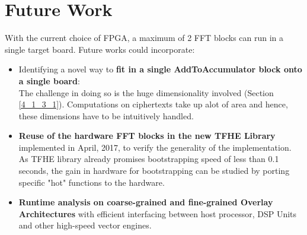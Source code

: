 \section{Future Work}
With the current choice of FPGA, a maximum of 2 FFT blocks can run in a single target board. Future works could incorporate:
\begin{itemize}
\item Identifying a novel way to \textbf{fit in a single AddToAccumulator block onto a single board}: \\The challenge in doing so is the huge dimensionality involved (Section \ref{4_1_3_1}). Computations on ciphertexts take up alot of area and hence, these dimensions have to be intuitively handled.
\item \textbf{Reuse of the hardware FFT blocks in the new TFHE Library} implemented in April, 2017, to verify the generality of the implementation. As TFHE library already promises bootstrapping speed of less than 0.1 seconds, the gain in hardware for bootstrapping can be studied by porting specific "hot" functions to the hardware.
\item \textbf{Runtime analysis on coarse-grained and fine-grained Overlay Architectures} with efficient interfacing between host processor, DSP Units and other high-speed vector engines.
\end{itemize}
